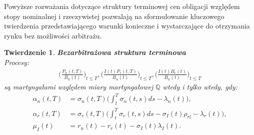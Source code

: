 \documentclass{mini}
\theoremstyle{mythstyle}
\newtheorem{Twierdzenie}{Twierdzenie}[chapter]
\begin{document}
	Powyższe rozważania dotyczące struktury terminowej cen obligacji względem stopy nominalnej i rzeczywistej pozwalają na sformułowanie kluczowego twierdzenia przedstawiającego warunki konieczne i wystarczające do otrzymania rynku bez możliwości arbitrażu.\\
	
	\begin{Twierdzenie} \textbf{Bezarbitrażowa struktura terminowa}\\
		Procesy:
		\begin{eqnarray*}
			\bigg(\frac{P_n(t,T)}{B_n(t)}\bigg)_{t\le T}, \bigg(\frac{I(t)P_r(t,T)}{B_n(t)}\bigg)_{t\le T}, \bigg(\frac{I(t)B_r(t)}{B_n(t)}\bigg)_{t\le T}
		\end{eqnarray*}
		są martyngałami względem miary martyngałowej $\mathbb{Q}$ wtedy i tylko wtedy, gdy:
		\begin{align}
		\alpha_n(t,T) &= \sigma_n(t,T)\bigg(\int_{t}^{T}\sigma_n(t,s)ds-\lambda_n(t)\bigg),\\
		\alpha_r(t,T) &= \sigma_r(t,T)\bigg(\int_{t}^{T}\sigma_r(t,s)ds-\sigma_I(t)\rho_{rl}-\lambda_r(t)\bigg),\\
		\mu_I(t) &= r_n(t)-r_r(t)-\sigma_I(t)\lambda_I(t).
		\end{align}
	\end{Twierdzenie}
	
\end{document}
